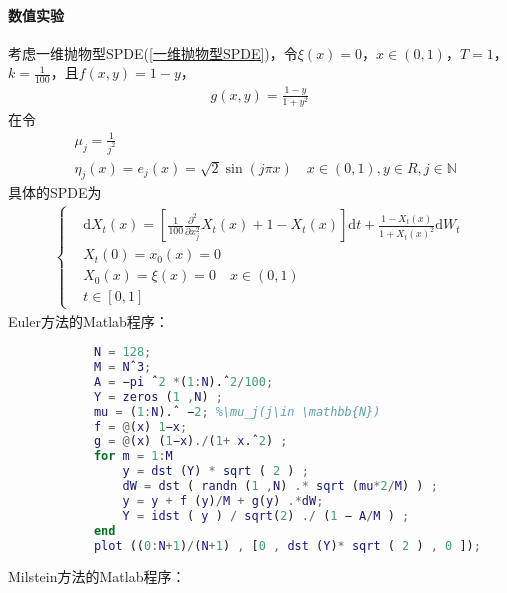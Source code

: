             \paragraph{数值实验}
            考虑一维抛物型SPDE(\ref{一维抛物型SPDE})，令$\xi(x) = 0$，$x\in (0,1)$，$T = 1$，$k = \frac{1}{100}$，且$f(x,y) = 1-y$，
            \begin{align*}
            g(x,y) = \frac{1-y}{1+y^2}
            \end{align*}
            在令
            \begin{align*}
            &\mu_j = \frac{1}{j^2}\\
            &\eta_j(x) = e_j(x) = \sqrt{2}\sin(j\pi x) \quad x\in(0,1),y\in R, j\in \mathbb{N}
            \end{align*}
            具体的SPDE为
            \begin{align*}
                \left\{
                    \begin{aligned}
                    &\mathrm{d}X_t(x) = \left[ \frac{1}{100}  \frac{\partial^2}{\partial x_j^2} X_t(x) + 1-X_t(x)  \right]\mathrm{d}t + \frac{1-X_t(x)}{1+X_t(x)^2}\mathrm{d}W_t\\
                    &X_t(0) = x_0(x) = 0\\
                    &X_0(x) = \xi(x) = 0\quad x\in (0,1)\\
                    &t\in [0,1]
                    \end{aligned}
                \right.
            \end{align*}
            Euler方法的Matlab程序：
            \begin{lstlisting}[language= Matlab]
            %% 此程序是SPDE模型的Euler方法
            N = 128;
            M = Nˆ3;
            A = −pi ˆ2 *(1:N).ˆ2/100;
            Y = zeros (1 ,N) ;
            mu = (1:N).ˆ −2; %\mu_j(j\in \mathbb{N})
            f = @(x) 1−x;
            g = @(x) (1−x)./(1+ x.ˆ2) ;
            for m = 1:M
                y = dst (Y) * sqrt ( 2 ) ;
                dW = dst ( randn (1 ,N) .* sqrt (mu*2/M) ) ;
                y = y + f (y)/M + g(y) .*dW;
                Y = idst ( y ) / sqrt(2) ./ (1 − A/M ) ;
            end
            plot ((0:N+1)/(N+1) , [0 , dst (Y)* sqrt ( 2 ) , 0 ]);
            \end{lstlisting}
            Milstein方法的Matlab程序：
